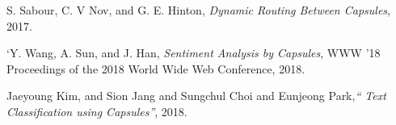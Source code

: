 \documentclass[a4 paper, 12pt]{article}
\begin{document}
\begin{flushleft}
\begin{thebibliography}{5}

S. Sabour, C. V Nov, and G. E. Hinton,\textit{ Dynamic Routing Between Capsules}, 2017.

`Y. Wang, A. Sun, and J. Han,\textit{ Sentiment Analysis by
Capsules}, WWW '18 Proceedings of the 2018 World
Wide Web Conference, 2018.

Jaeyoung Kim, and Sion Jang and Sungchul Choi and
Eunjeong Park,\textit{“ Text Classification using Capsules”}, 2018.

\end{thebibliography}
\end{flushleft}
\end{document}
